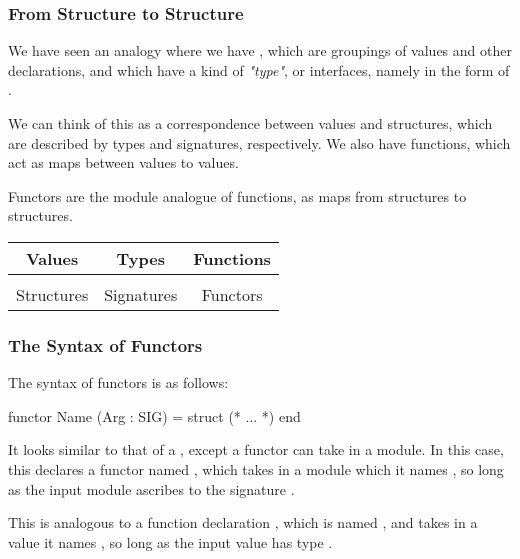 \documentclass[aspectratio=169]{beamer}
\begin{document}

\begin{frame}[fragile]
  \frametitle{From Structure to Structure}

  We have seen an analogy where we have , which are groupings
  of values and other declarations, and which have a kind of \textit{"type"}, or
  interfaces, namely in the form of .

  \pause
  \vspace{\fill}

  We can think of this as a correspondence between values and structures, which
  are described by types and signatures, respectively. We also have functions,
  which act as maps between values to values.

  \pause
  \vspace{\fill}

  Functors are the module analogue of functions, as maps from structures to structures.

  \vspace{\fill}

  \begin{center}
    \begin{tabular}{ c|c|c }
    Values & Types & Functions \\ [0.5ex]
    \hline & \\[-1.5ex]
    Structures & Signatures & Functors
    \end{tabular}
  \end{center}
\end{frame}

\begin{frame}[fragile]
  \frametitle{The Syntax of Functors}

  The syntax of functors is as follows:

  \begin{codeblock}
    functor Name (Arg : SIG) =
      struct
        (* ... *)
      end
  \end{codeblock}

  \pause
  \vspace{\fill}

  It looks similar to that of a , except a functor can take in
  a module. In this case, this declares a functor named , which takes
  in a module which it names , so long as the input module ascribes to
  the signature .

  \pause
  \vspace{\fill}

  This is analogous to a function declaration , which is named , and takes in a value it names ,
  so long as the input value has type .
\end{frame}
\end{document}
